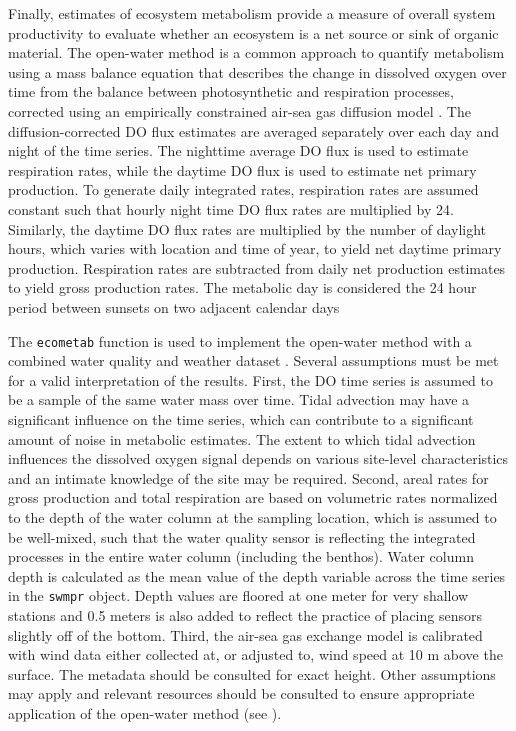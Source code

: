 \documentclass[10pt,letterpaper]{article}\usepackage[]{graphicx}\usepackage[]{color}
\begin{document}
Finally, estimates of ecosystem metabolism provide a measure of overall system productivity to evaluate whether an ecosystem is a net source or sink of organic material.  The open-water method \cite{Odum56} is a common approach to quantify metabolism using a mass balance equation that describes the change in dissolved oxygen over time from the balance between photosynthetic and respiration processes, corrected using an empirically constrained air-sea gas diffusion model \cite{Ro06,Thebault08}. The diffusion-corrected \ac{DO} flux estimates are averaged separately over each day and night of the time series. The nighttime average \ac{DO} flux is used to estimate respiration rates, while the daytime \ac{DO} flux is used to estimate net primary production. To generate daily integrated rates, respiration rates are assumed constant such that hourly night time \ac{DO} flux rates are multiplied by 24. Similarly, the daytime \ac{DO} flux rates are multiplied by the number of daylight hours, which varies with location and time of year, to yield net daytime primary production. Respiration rates are subtracted from daily net production estimates to yield gross production rates. The metabolic day is considered the 24 hour period between sunsets on two adjacent calendar days  

The \texttt{ecometab} function is used to implement the open-water method with a combined water quality and weather dataset \cite{Caffrey14}.  Several assumptions must be met for a valid interpretation of the results.  First, the \ac{DO} time series is assumed to be a sample of the same water mass over time.  Tidal advection may have a significant influence on the time series, which can contribute to a significant amount of noise in metabolic estimates.  The extent to which tidal advection influences the dissolved oxygen signal depends on various site-level characteristics and an intimate knowledge of the site may be required.  Second, areal rates for gross production and total respiration are based on volumetric rates normalized to the depth of the water column at the sampling location, which is assumed to be well-mixed, such that the water quality sensor is reflecting the integrated processes in the entire water column (including the benthos).  Water column depth is calculated as the mean value of the depth variable across the time series in the \texttt{swmpr} object. Depth values are floored at one meter for very shallow stations and 0.5 meters is also added to reflect the practice of placing sensors slightly off of the bottom.  Third, the air-sea gas exchange model is calibrated with wind data either collected at, or adjusted to, wind speed at 10 m above the surface.  The metadata should be consulted for exact height. Other assumptions may apply and relevant resources should be consulted to ensure appropriate application of the open-water method (see \cite{Kemp12,Needoba12}).
\end{document}
